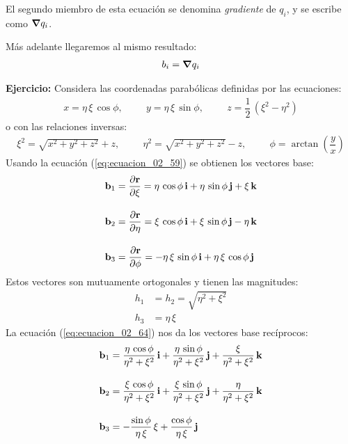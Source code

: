 El segundo miembro de esta ecuación se denomina \emph{gradiente} de $q_{i}$, y se escribe como $\grad{q_{i}}$.
\par
Más adelante llegaremos al mismo resultado:
\begin{align}
    b_{i} = \grad{q_{i}}
    \label{eq:ecuacion_02_68}
\end{align}
\par
\noindent
\textbf{Ejercicio: } Considera las coordenadas parabólicas definidas por las ecuaciones:
\begin{align*}
    x = \eta \, \xi \, \cos \phi, \hspace{1cm} y = \eta \, \xi \, \sin \phi, \hspace{1cm} z = \dfrac{1}{2} \, \left( \xi^{2} - \eta^{2} \right)
\end{align*}
o con las relaciones inversas:
\begin{align*}
    \xi^{2} = \sqrt{x^{2} + y^{2} + z^{2}} + z, \hspace{1cm} \eta^{2} = \sqrt{x^{2} + y^{2} + z^{2}} - z, \hspace{1cm} \phi = \arctan \left( \dfrac{y}{x} \right) 
\end{align*}
Usando la ecuación (\ref{eq:ecuacion_02_59}) se obtienen los vectores base:
\begin{align*}
    \vb{b}_{1} &= \pdv{\vb{r}}{\xi} = \eta \, \cos \phi \, \vb{i} + \eta \, \sin \phi \, \vb{j} + \xi \, \vb{k} \\[1em]
    \vb{b}_{2} &= \pdv{\vb{r}}{\eta} = \xi \, \cos \phi \, \vb{i} + \xi \, \sin \phi \, \vb{j} - \eta \, \vb{k} \\[1em]
    \vb{b}_{3} &= \pdv{\vb{r}}{\phi} = - \eta \, \xi \, \sin \phi \, \vb{i} + \eta \, \xi \, \cos \phi \, \vb{j}
\end{align*}
Estos vectores son mutuamente ortogonales y tienen las magnitudes:
\begin{align*}
    h_{1} &= h_{2} = \sqrt{\eta^{2} + \xi^{2}} \\[0.5em]
    h_{3} &= \eta \, \xi
\end{align*} 
La ecuación (\ref{eq:ecuacion_02_64}) nos da los vectores base recíprocos:
\begin{align*}
    \vb{b}_{1} &= \dfrac{ \eta \, \cos \phi}{\eta^{2} + \xi^{2}} \, \vb{i} + \dfrac{\eta \, \sin \phi}{\eta^{2} + \xi^{2}} \, \vb{j} + \dfrac{\xi}{\eta^{2} + \xi^{2}} \, \vb{k} \\[1em]
    \vb{b}_{2} &= \dfrac{ \xi \, \cos \phi}{\eta^{2} + \xi^{2}} \, \vb{i} + \dfrac{\xi \, \sin \phi}{\eta^{2} + \xi^{2}} \, \vb{j} + \dfrac{\eta}{\eta^{2} + \xi^{2}} \, \vb{k} \\[1em]
    \vb{b}_{3} &= - \dfrac{\sin \phi}{\eta \, \xi} \, \xi + \dfrac{\cos \phi}{\eta \, \xi} \, \vb{j}
\end{align*}
